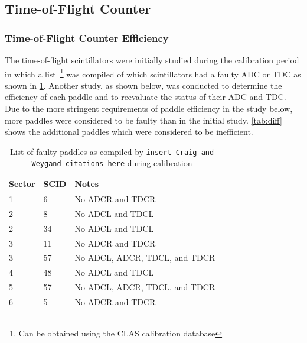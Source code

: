 \subsection{\label{sec:calib.tof}Time-of-Flight Counter}

\subsubsection{\label{sec:calib.tof.eff}Time-of-Flight Counter Efficiency}

The time-of-flight scintillators were initially studied during the calibration period in which a list~\footnote{Can be obtained using the CLAS calibration database} was compiled of which scintillators had a faulty ADC or TDC as shown in \ref{tab:craigtof}. Another study, as shown below, was conducted to determine the efficiency of each paddle and to reevaluate the status of their ADC and TDC. Due to the more stringent requirements of paddle efficiency in the study below, more paddles were considered to be faulty than in the initial study. \ref{tab:diff} shows the additional paddles which were considered to be inefficient.

\begin{table}
\begin{tabular}{l|l|p{}} %
Sector & SCID & Notes \\
\hline
1 & 6 & No ADCR and TDCR \\
2 & 8 & No ADCL and TDCL \\
2 & 34 & No ADCL and TDCL \\
3 & 11 & No ADCR and TDCR \\
3 & 57 & No ADCL, ADCR, TDCL, and TDCR \\
4 & 48 & No ADCL and TDCL \\
5 & 57 & No ADCL, ADCR, TDCL, and TDCR \\
6 & 5 & No ADCR and TDCR

\end{tabular}
    \caption{List of faulty paddles as compiled by \texttt{insert Craig and Weygand citations here} during calibration}
    \label{tab:craigtof}
\end{table}

